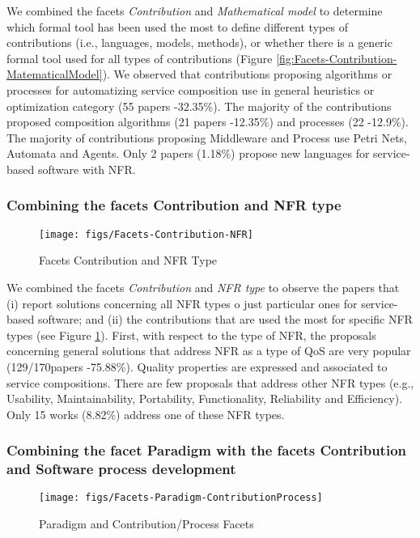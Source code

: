 We combined the facets {\em Contribution} and {\em Mathematical model} to determine which formal tool has been used the most to define different types of contributions (i.e., languages, models, methods), or whether there is a generic formal tool used for all types of contributions (Figure \ref{fig:Facets-Contribution-MatematicalModel}). We observed that contributions proposing algorithms  or processes for automatizing service composition use in general  heuristics or optimization category (55 papers -32.35\%). The majority of the contributions proposed composition algorithms (21 papers -12.35\%) and processes  (22 -12.9\%). The majority of contributions proposing Middleware and Process use  Petri Nets, Automata and Agents. Only 2 papers (1.18\%) propose new languages for
service-based software with NFR. 
 
\subsubsection{Combining the facets Contribution and NFR type}

\begin{figure}[ht!]
\centering
\texttt{[image: figs/Facets-Contribution-NFR]}
\caption{Facets Contribution and NFR Type}
\label{fig:Facets-Contribution-NFR}
\end{figure}  
       
We combined the facets {\em Contribution} and {\em NFR type} to observe the papers that (i) report solutions concerning all NFR types o just particular ones for service-based software; and (ii) the contributions that are used the most for specific NFR types (see
Figure \ref{fig:Facets-Contribution-NFR}).  First, with respect to the type of NFR, the proposals concerning general solutions that address NFR as a type of QoS are very popular (129/170papers -75.88\%). Quality properties are expressed and associated to service compositions. There are few proposals that address other NFR types  (e.g., Usability, Maintainability, Portability, Functionality, Reliability and Efficiency). Only 15 works (8.82\%) address one of
these NFR types. 

\subsubsection{Combining the facet Paradigm with the facets Contribution  and Software process development}
\begin{figure} [htpb]
\centering
\texttt{[image: figs/Facets-Paradigm-ContributionProcess]}
\caption{Paradigm and Contribution/Process Facets}
\label{fig:Facets-Paradigm-ContributionProcess}
\end{figure}  

